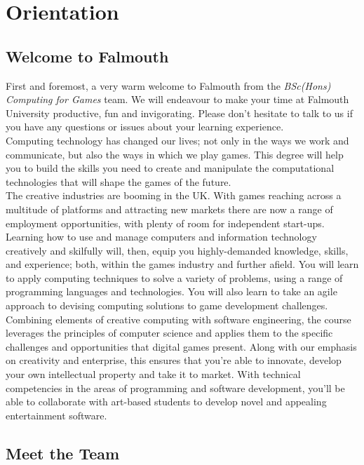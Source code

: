 \chapter{Orientation}
\newpage

\section{Welcome to Falmouth}

First and foremost, a very warm welcome to Falmouth from the \textit{BSc(Hons) Computing for Games} team. We will endeavour to make your time at Falmouth University productive, fun and invigorating. Please don't hesitate to talk to us if you have any questions or issues about your learning experience. \\

Computing technology has changed our lives; not only in the ways we work and communicate, but also the ways in which we play games. This degree will help you to build the skills you need to create and manipulate the computational technologies that will shape the games of the future. \\

The creative industries are booming in the UK. With games reaching across a multitude of platforms and attracting new markets there are now a range of employment opportunities, with plenty of room for independent start-ups. Learning how to use and manage computers and information technology creatively and skilfully will, then, equip you highly-demanded knowledge, skills, and experience; both, within the games industry and further afield. You will learn to apply computing techniques to solve a variety of problems, using a range of programming languages and technologies. You will also learn to take an agile approach to devising computing solutions to game development challenges. Combining elements of creative computing with software engineering, the course leverages the principles of computer science and applies them to the specific challenges and opportunities that digital games present. Along with our emphasis on creativity and enterprise, this ensures that you're able to innovate, develop your own intellectual property and take it to market. With technical competencies in the areas of programming and software development, you'll be able to collaborate with art-based students to develop novel and appealing entertainment software. \\

\section{Meet the Team}

